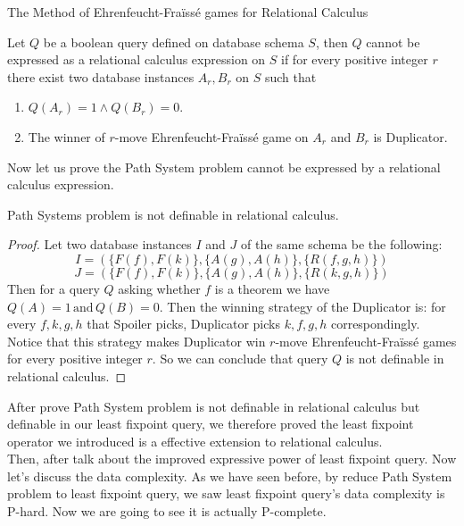 \begin{description}
\item[The Method of Ehrenfeucht-Fra\"iss\'e games for Relational Calculus]
\end{description}
Let $Q$ be a boolean query defined on database schema $S$, then $Q$ cannot be expressed as a relational calculus expression on $S$ if for every positive integer $r$ there exist two database instances $A_r, B_r$ on $S$ such that
\begin{enumerate}
    \item $Q(A_r)=1\land Q(B_r)=0$.
    \item The winner of $r$-move Ehrenfeucht-Fra\"iss\'e game on $A_r$ and $B_r$ is Duplicator.
\end{enumerate}
Now let us prove the Path System problem cannot be expressed by a relational calculus expression.

\begin{claim}
Path Systems problem is not definable in relational calculus.
\end{claim}

\begin{proof}
Let two database instances $I$ and $J$ of the same schema be the following:
$$I=(\{F(f), F(k)\}, \{A(g),A(h)\},\{R(f,g,h)\})$$
$$J=(\{F(f), F(k)\}, \{A(g),A(h)\}, \{R(k,g,h)\})$$
Then for a query $Q$ asking whether $f$ is a theorem we have $Q(A)=1 \, \text{and} \, Q(B)=0$. Then the winning strategy of the Duplicator is: for every $f,k,g,h$ that Spoiler picks, Duplicator picks $k,f,g,h$ correspondingly. Notice that this strategy makes Duplicator win $r$-move Ehrenfeucht-Fra\"iss\'e games for every positive integer $r$. So we can conclude that query $Q$ is not definable in relational calculus.
\end{proof}

After prove Path System problem is not definable in relational calculus but definable in our least fixpoint query, we therefore proved the least fixpoint operator we introduced is a effective extension to relational calculus.\\

Then, after talk about the improved expressive power of least fixpoint query. Now let's discuss the data complexity. As we have seen before, by reduce Path System problem to least fixpoint query, we saw least fixpoint query's data complexity is P-hard. Now we are going to see it is actually P-complete.\\

